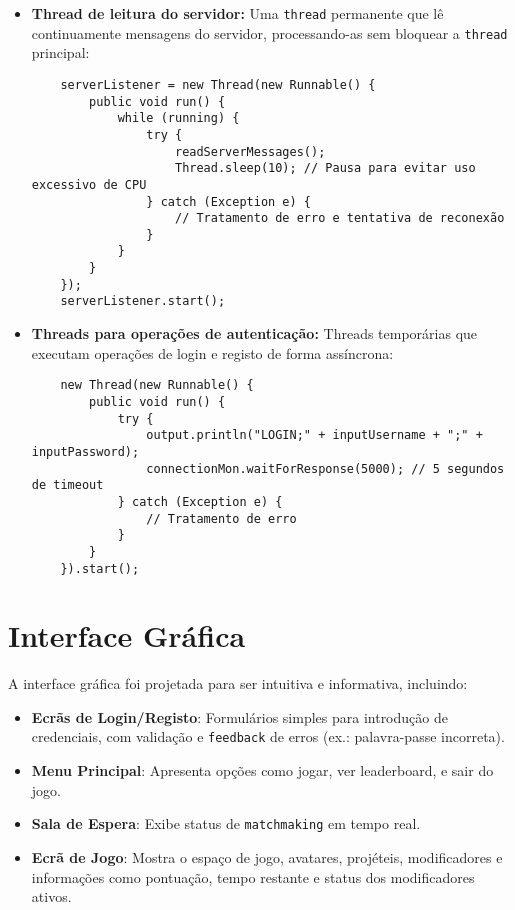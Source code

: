 \documentclass[12pt,a4paper]{report}
\begin{document}
\begin{itemize}
    \item \textbf{Thread de leitura do servidor:} Uma \texttt{thread} permanente que lê continuamente mensagens do servidor, processando-as sem bloquear a \texttt{thread} principal:
    
    \begin{verbatim}
    serverListener = new Thread(new Runnable() {
        public void run() {
            while (running) {
                try {
                    readServerMessages();
                    Thread.sleep(10); // Pausa para evitar uso excessivo de CPU
                } catch (Exception e) {
                    // Tratamento de erro e tentativa de reconexão
                }
            }
        }
    });
    serverListener.start();
    \end{verbatim}
    
    \item \textbf{Threads para operações de autenticação:} Threads temporárias que executam operações de login e registo de forma assíncrona:
    
    \begin{verbatim}
    new Thread(new Runnable() {
        public void run() {
            try {
                output.println("LOGIN;" + inputUsername + ";" + inputPassword);
                connectionMon.waitForResponse(5000); // 5 segundos de timeout
            } catch (Exception e) {
                // Tratamento de erro
            }
        }
    }).start();
    \end{verbatim}
\end{itemize}

\section{Interface Gráfica}

A interface gráfica foi projetada para ser intuitiva e informativa, incluindo:

\begin{itemize}
    \item \textbf{Ecrãs de Login/Registo}: Formulários simples para introdução de credenciais, com validação e \texttt{feedback} de erros (ex.: palavra-passe incorreta).
    
    \item \textbf{Menu Principal}: Apresenta opções como jogar, ver leaderboard, e sair do jogo.
    
    \item \textbf{Sala de Espera}: Exibe status de \texttt{matchmaking} em tempo real.
    
    \item \textbf{Ecrã de Jogo}: Mostra o espaço de jogo, avatares, projéteis, modificadores e informações como pontuação, tempo restante e status dos modificadores ativos.
\end{itemize}
\end{document}

